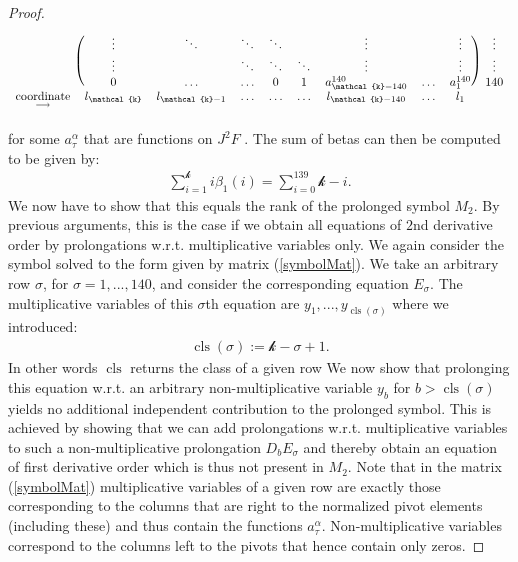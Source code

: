 \begin{proof}
\begin{align}
\begin{blockarray}{cccccccccc}
\begin{block}{c(cccccccc)c}
    & \vdots & \ddots  & \ddots & \ddots &  & \vdots & & \vdots & \vdots \\
    & \vdots & & \ddots & \ddots & \ddots & \vdots & & \vdots &  \vdots\\
    & 0 & \hdots  & \hdots & 0 & 1 & a^{140}_{\mathcal{k}-140} & \hdots & a^{140}_{1} &  140 \\
\end{block}
\underset{\longrightarrow}{\text{coordinate}} & l_{\mathcal{k}} & l_{\mathcal{k} -1} & \hdots & \hdots & \hdots & l_{\mathcal{k}- 140} & \hdots & l_1 &
\end{blockarray}
\end{align}
for some $a^{\alpha}_{\tau}$ that are functions on $J^2F$ . The sum of betas can then be computed to be given by:
\begin{align}
    \sum_{i=1}^{\mathcal{k}} i \beta_1(i) = \sum_{i = 0}^{139} \mathcal{k} - i .
\end{align}
We now have to show that this equals the rank of the prolonged symbol $M_2$. By previous arguments, this is the case if we obtain all equations of $2$nd derivative order by prolongations w.r.t. multiplicative variables only. We again consider the symbol solved to the form given by matrix (\ref{symbolMat}). 
We take an arbitrary row $\sigma$, for $\sigma=1,...,140$, and consider the corresponding equation $E_{\sigma}$. The multiplicative variables of this $\sigma$th equation are $y_1,...,y_{\operatorname{cls}(\sigma)}$ where we introduced: 
\begin{align}
\operatorname{cls}(\sigma):= \mathcal{k} - \sigma +1.
\end{align}
In other words $\operatorname{cls}$ returns the class of a given row
We now show that prolonging this equation w.r.t. an arbitrary non-multiplicative variable $y_b$ for $b>\operatorname{cls}(\sigma)$ yields no additional independent contribution to the prolonged symbol. This is achieved by showing that we can add prolongations w.r.t. multiplicative variables to such a non-multiplicative prolongation $D_bE_{\sigma}$ and thereby obtain an equation of first derivative order which is thus not present in $M_2$. Note that in the matrix (\ref{symbolMat}) multiplicative variables of a given row are exactly those corresponding to the columns that are right to the normalized pivot elements (including these) and thus contain the functions $a^{\alpha}_{\tau}$. Non-multiplicative variables correspond to the columns left to the pivots that hence contain only zeros.


\end{proof}

